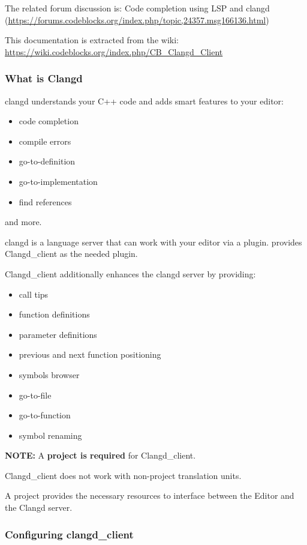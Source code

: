 The related forum discussion is: Code completion using LSP and clangd\newline
(\url{https://forums.codeblocks.org/index.php/topic,24357.msg166136.html})

This documentation is extracted from the wiki: \url{https://wiki.codeblocks.org/index.php/CB_Clangd_Client}

\subsubsection{What is Clangd}

clangd understands your C++ code and adds smart features to your editor:
\begin{itemize}[noitemsep]
\item code completion
\item compile errors
\item go-to-definition
\item go-to-implementation
\item find references
\end{itemize}
and more.

clangd is a language server that can work with your editor via a plugin.\newline
\codeblocks provides Clangd\_client as the needed plugin.

Clangd\_client additionally enhances the clangd server by providing:
\begin{itemize}[noitemsep]
\item call tips
\item function definitions
\item parameter definitions
\item previous and next function positioning
\item symbols browser
\item go-to-file
\item go-to-function
\item symbol renaming
\end{itemize}

\textbf{NOTE:} A \codeblocks \textbf{project is required} for Clangd\_client.

Clangd\_client does not work with non-project translation units.

A project provides the necessary resources to interface between the Editor and the Clangd server.

\subsubsection{Configuring clangd\_client}\label{sec:cfg_client}

